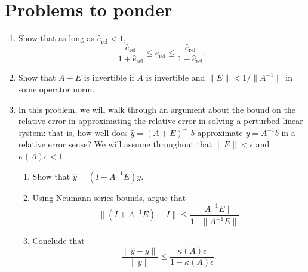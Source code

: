 \documentclass[12pt, leqno]{article}
\begin{document}
\section{Problems to ponder}

\begin{enumerate}
\item Show that as long as $\hat{e}_{\mathrm{rel}} < 1$,
  \[
  \frac{\hat{e}_{\mathrm{rel}}}{1+\hat{e}_{\mathrm{rel}}} \leq
  e_{\mathrm{rel}} \leq
  \frac{\hat{e}_{\mathrm{rel}}}{1-\hat{e}_{\mathrm{rel}}}.
  \]
\item Show that $A+E$ is invertible if $A$ is invertible and
  $\|E\| < 1/\|A^{-1}\|$ in some operator norm.
\item In this problem, we will walk through an argument about
  the bound on the relative error in approximating the
  relative error in solving a perturbed linear system:
  that is, how well does $\hat{y} = (A+E)^{-1} b$ approximate
  $y = A^{-1} b$ in a relative error sense?  We will assume
  throughout that $\|E\| < \epsilon$ and $\kappa(A) \epsilon < 1$.
  \begin{enumerate}
  \item Show that $\hat{y} = (I+A^{-1} E) y$.
  \item Using Neumann series bounds, argue that
    \[
      \|(I+A^{-1} E)-I\| \leq \frac{\|A^{-1} E\|}{1-\|A^{-1} E\|}
    \]
  \item Conclude that
    \[
    \frac{\|\hat{y}-y\|}{\|y\|} \leq
    \frac{\kappa(A) \epsilon}{1-\kappa(A) \epsilon}.
    \]
  \end{enumerate}
\end{enumerate}
\end{document}

